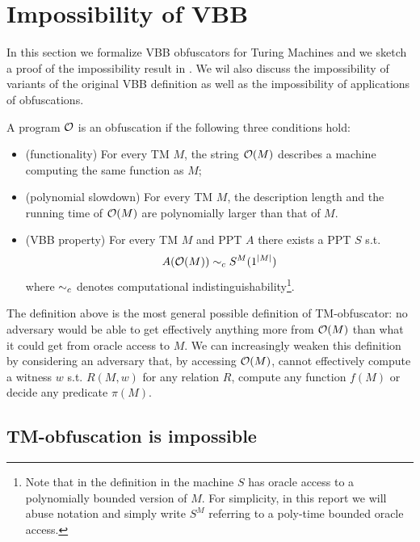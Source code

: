 \section{Impossibility of VBB}

In this section we formalize VBB obfuscators for Turing Machines and we sketch a proof of the impossibility result in \cite{VBB-imp}. We wil also discuss the impossibility of variants of the original VBB definition as well as the impossibility of applications of obfuscations.

\begin{comment}
In this section:
- definition of VBB
- sketch proof
\end{comment}

\begin{mydef}[TM-obfuscator]
	\label{def:VBB-tm}
	A program $\mathcal{O}$ is an obfuscation if the following three conditions hold: %
	\begin{itemize}
		\item (functionality) For every TM $M$, the string $\mathcal{O}(M)$ describes a machine computing the same function as $M$;
		\item (polynomial slowdown)  For every TM $M$, the description length and the running time of $\mathcal{O}(M)$ are polynomially larger than that of $M$.
		\item (VBB property) For every TM $M$ and PPT $A$ there exists a PPT $S$ s.t. 
		$$ A(\mathcal{O}(M)) \sim_c S^M(1^{|M|}) $$
		where $\sim_c$ denotes computational indistinguishability\footnote{Note that in the definition in \cite{VBB-imp} the machine $S$ has oracle access to a polynomially bounded version of $M$. For simplicity, in this report we will abuse notation and simply write $S^M$ referring to a poly-time bounded oracle access. }.
	\end{itemize}
\end{mydef}

The definition above is the most general possible definition of TM-obfuscator: no adversary would be able to get effectively anything more from $\mathcal{O}(M)$ than what it could get from oracle access to $M$. We can increasingly weaken this definition by considering an adversary that, by accessing $\mathcal{O}(M)$, cannot effectively compute a witness $w$ s.t. $R(M,w)$ for any relation $R$, compute any function $f(M)$ or decide any predicate $\pi(M)$.



\subsection{TM-obfuscation is impossible}

